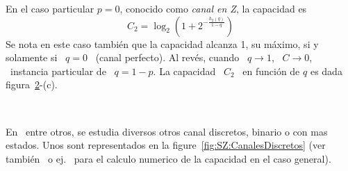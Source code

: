 En el  caso particular $p  = 0$,  conocido como {\it  canal en Z},  la capacidad
es
%
\[
C_2 = \log_2\left( 1 +  2^{- \frac{h_2(q)}{1-q}} \right)
\]
%
Se nota  en este caso tambi\'en  que la capacidad  alcanza 1, su m\'aximo,  si y
solamente si \ $q = 0$ \ (canal perfecto).  Al rev\'es, cuando \ $q \to 1$, \ $C
\to  0$, \ instancia  particular de  \ $q  = 1-p$.   La capacidad  \ $C_2$  \ en
funci\'on de $q$ es dada figura~\ref{fig:SZ:CCanalBinario}-(c).


\begin{figure}[h!]
\begin{center}\end{center}
\label{fig:SZ:ICanalBinario}
\end{figure}

\

\begin{figure}[h!]
\begin{center}\end{center}
\label{fig:SZ:CCanalBinario}
\end{figure}

En~\cite{CovTho06,  Rio07}   entre  otros,  se  estudia   diversos  otros  canal
discretos,  binario  o   con  mas  estados.   Unos  sont   representados  en  la
figure~\ref{fig:SZ:CanalesDiscretos}   (ver   tambi\'en~\cite{Sha48,
  Eli57} o ej.~\cite{Ari72} para el calculo  numerico de la capacidad en el caso
general).


